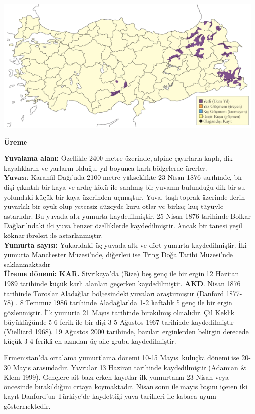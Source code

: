 \documentclass[
  letterpaper,
  DIV=11,
  numbers=noendperiod]{scrreprt}
\begin{document}
\includegraphics{images/harita_Page_038.png}

\textbf{Üreme}

\textbf{Yuvalama alanı:} Özellikle 2400 metre üzerinde, alpine
çayırlarla kaplı, dik kayalıkların ve yarların olduğu, yıl boyunca karlı
bölgelerde ürerler.\\
\textbf{Yuvası:} Karanfil Dağı'nda 2100 metre yükseklikte 23 Nisan 1876
tarihinde, bir dişi çıkıntılı bir kaya ve ardıç kökü ile sarılmış bir
yuvanın bulunduğu dik bir su yolundaki küçük bir kaya üzerinden
uçmuştur. Yuva, taşlı toprak üzerinde derin yuvarlak bir oyuk olup
yetersiz düzeyde kuru otlar ve birkaç kuş tüyüyle astarlıdır. Bu yuvada
altı yumurta kaydedilmiştir. 25 Nisan 1876 tarihinde Bolkar
Dağları'ndaki iki yuva benzer özelliklerde kaydedilmiştir. Ancak bir
tanesi yeşil köknar ibreleri ile astarlanmıştır.\\
\textbf{Yumurta sayısı:} Yukarıdaki üç yuvada altı ve dört yumurta
kaydedilmiştir. İki yumurta Manchester Müzesi'nde, diğerleri ise Tring
Doğa Tarihi Müzesi'nde saklanmaktadır.\\
\textbf{Üreme dönemi:} \textbf{KAR.} Sivrikaya'da (Rize) beş genç ile
bir ergin 12 Haziran 1989 tarihinde küçük karlı alanları geçerken
kaydedilmiştir. \textbf{AKD.} Nisan 1876 tarihinde Toroslar Aladağlar
bölgesindeki yuvaları araştırmıştır (Danford 1877-78) . 8 Temmuz 1986
tarihinde Aladağlar'da 1-2 haftalık 5 genç ile bir ergin gözlenmiştir.
İlk yumurta 21 Mayıs tarihinde bırakılmış olmalıdır. Çil Keklik
büyüklüğünde 5-6 ferik ile bir dişi 3-5 Ağustos 1967 tarihinde
kaydedilmiştir (Vielliard 1968). 19 Ağustos 2000 tarihinde, bazıları
erginlerden belirgin derecede küçük 3-4 ferikli en azından üç aile grubu
kaydedilmiştir.

Ermenistan'da ortalama yumurtlama dönemi 10-15 Mayıs, kuluçka dönemi ise
20-30 Mayıs arasındadır. Yavrular 13 Haziran tarihinde kaydedilmiştir
(Adamian \& Klem 1999). Gençlere ait bazı erken kayıtlar ilk yumurtanın
23 Nisan veya öncesinde bırakıldığını ortaya koymaktadır. Nisan sonu ile
mayıs başını içeren iki kayıt Danford'un Türkiye'de kaydettiği yuva
tarihleri ile kabaca uyum göstermektedir.
\end{document}
